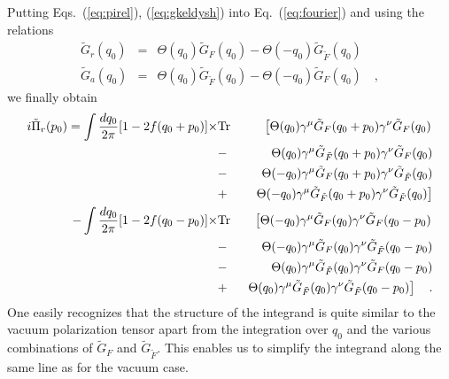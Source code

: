 Putting Eqs.~(\ref{eq:pirel}), (\ref{eq:gkeldysh}) into
Eq.~(\ref{eq:fourier})
and using the relations
\begin{eqnarray}
\tilde{G}_{r}(q_{0}) & = & \Theta (q_{0}) \tilde{G}_{F}(q_{0}) -
\Theta(-q_{0}) \tilde{G}_{\tilde{F}}(q_{0}) \\
\tilde{G}_{a}(q_{0}) & = & \Theta (q_{0}) \tilde{G}_{\tilde{F}}(q_{0}) -
\Theta(-q_{0}) \tilde{G}_{F}(q_{0}) \quad ,
\end{eqnarray}
we finally obtain
\begin{eqnarray}
i \tilde{\Pi}_{r}(p_{0}) =  \int \frac{dq_{0}}{2\pi} [1 - 2f(q_{0} + p_{0})]
 \times & {\rm Tr} &
\left[ \Theta (q_{0}) \gamma ^{\mu}\tilde{G}_{F}(q_{0} + p_{0})
\gamma ^{\nu} \tilde{G}_{F}(q_{0})
\right . \nonumber \\& - & \ 
\Theta (q_{0}) \gamma ^{\mu} \tilde{G}_{\tilde{F}}(q_{0} + p_{0})
\gamma ^{\nu}\tilde{G}_{F}(q_{0}) 
\nonumber \\
& - & \ \Theta(-q_{0}) \gamma ^{\mu}\tilde{G}_{F}( q_{0} +
p_{0})\gamma ^{\nu}\tilde{G}_{\tilde{F}}(q_{0})
\nonumber \\ & + & \, \left .
\Theta (-q_{0}) \gamma ^{\mu} \tilde{G}_{\tilde{F}}( q_{0} + p_{0}) 
\gamma ^{\nu} \tilde{G}_{\tilde{F}} (q_{0}) \right ] \nonumber \\
 - \int \frac{dq_{0}}{2\pi} [1 - 2f(q_{0} - p_{0})] \times &{\rm Tr}&
\left[\Theta (-q_{0}) \gamma ^{\mu} \tilde{G}_{F}(q_{0}) 
\gamma ^{\nu} \tilde{G}_{F}(q_{0} - p_{0}) \right .
\nonumber \\
& - & \ \Theta (-q_{0}) \gamma ^{\mu} \tilde{G}_{F}(q_{0})
\gamma ^{\nu} \tilde{G}_{\tilde{F}}(q_{0} - p_{0}) \nonumber \\
& - & \ \Theta (q_{0}) \gamma ^{\mu} \tilde{G}_{\tilde{F}}(q_{0})
\gamma ^{\nu} \tilde{G}_{F}(q_{0} - p_{0}) \nonumber \\
& + & \ \left . \Theta (q_{0}) \gamma ^{\mu} \tilde{G}_{\tilde{F}}(q_{0})
\gamma ^{\nu} \tilde{G}_{\tilde{F}}(q_{0} - p_{0}) \right ] \quad .
\label{eq:pifin}
\end{eqnarray}
One easily recognizes that the structure of the integrand is quite similar
to the vacuum  polarization tensor apart from the integration over $q_{0}$ and
the various  combinations of $\tilde{G}_{F}$ and $\tilde{G}_{\tilde{F}}$.
This enables us to simplify the integrand along the same line as for the
vacuum case.

